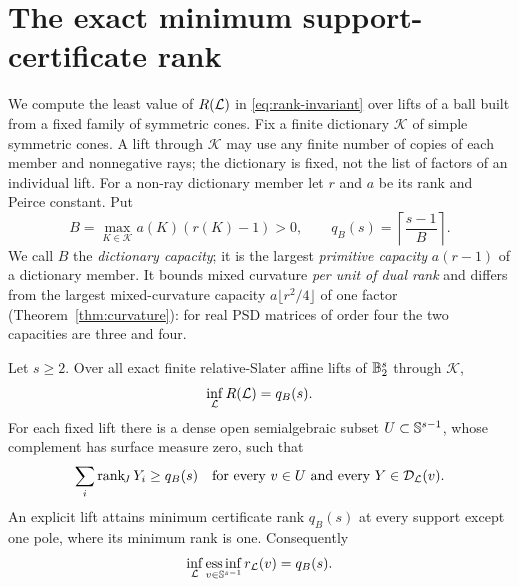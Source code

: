 \section{The exact minimum support-certificate rank}\label{sec:rank}
We compute the least value of $R(\mathcal L)$ in \eqref{eq:rank-invariant} over
lifts of a ball built from a fixed family of symmetric cones.
Fix a finite dictionary $\mathscr K$ of simple symmetric cones. A lift
through $\mathscr K$ may use any finite number of copies of each member
and nonnegative rays; the dictionary is fixed, not the list of factors
of an individual lift. For a non-ray dictionary member
let $r$ and $a$ be its rank and Peirce constant. Put
\begin{equation}\label{eq:dictionary-capacity}
 B=\max_{K\in\mathscr K}a(K)(r(K)-1)>0,
 \qquad q_B(s)=\left\lceil\frac{s-1}{B}\right\rceil.
\end{equation}
We call $B$ the \emph{dictionary capacity}; it is the largest
\emph{primitive capacity} $a(r-1)$ of a dictionary member. It bounds
mixed curvature \emph{per unit of dual rank} and differs from the largest
mixed-curvature capacity $a\lfloor r^2/4\rfloor$ of one factor
(Theorem~\ref{thm:curvature}): for real PSD matrices of order four the
two capacities are three and four.

\begin{theorem}\label{thm:rank-frontier}
Let $s\geq2$. Over all exact finite relative-Slater affine lifts of
$\mathbb B_2^s$ through $\mathscr K$,
\begin{equation}\label{eq:rank-frontier}
 \inf_{\mathcal L}R(\mathcal L)=q_B(s).
\end{equation}
For each fixed lift there is a dense open semialgebraic subset
$U\subset\mathbb S^{s-1}$, whose complement has surface measure zero, such
that
\[
 \sum_i\operatorname{rank}_{\!J} Y_i\geq q_B(s)
 \quad\text{for every }v\in U\text{ and every }Y\in\mathcal D_{\mathcal L}(v).
\]
An explicit lift attains minimum certificate rank $q_B(s)$ at every
support except one pole, where its minimum rank is one. Consequently
\begin{equation}\label{eq:essential-frontier}
 \inf_{\mathcal L}\operatorname*{ess\,inf}_{v\in\mathbb S^{s-1}}r_{\mathcal L}(v)=q_B(s).
\end{equation}
\end{theorem}


